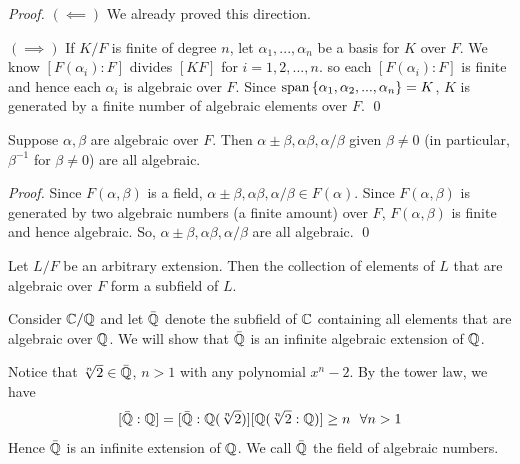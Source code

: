 \begin{proof}
    $(\impliedby)$ We already proved this direction.

    $(\implies)$ If $K/F$ is finite of degree $n$, let $\alpha_1, ..., \alpha_n$ be a basis for $K$ over $F$. We know $[F(\alpha_i):F]$ divides $[KF]$ for $i = 1,2,...,n$. so each $[F(\alpha_i):F]$ is finite and hence each $\alpha_i$ is algebraic over $F$. Since $\text{span} \left\{\alpha_1, \alpha_2,..., \alpha_n\right\} = K$, $K$ is generated by a finite number of algebraic elements over $F$.
    \qed
\end{proof}

\begin{corollary}
    Suppose $\alpha, \beta$ are algebraic over $F$. Then $\alpha \pm \beta, \alpha \beta, \alpha/\beta$ given $\beta \neq 0$ (in particular, $\beta^{-1}$ for $\beta \neq 0$) are all algebraic.
\end{corollary}

\begin{proof}
    Since $F(\alpha, \beta)$ is a field, $\alpha \pm \beta, \alpha \beta, \alpha/\beta \in F(\alpha)$. Since $F(\alpha, \beta)$ is generated by two algebraic numbers (a finite amount) over $F$, $F(\alpha, \beta)$ is finite and hence algebraic. So, $\alpha \pm \beta, \alpha \beta, \alpha/\beta$ are all algebraic.
    \qed
\end{proof}

\begin{corollary}
    Let $L/F$ be an arbitrary extension. Then the collection of elements of $L$ that are algebraic over $F$ form a subfield of $L$.
\end{corollary}

\begin{example}
    Consider $\mathbb{C}/\mathbb{Q}$ and let $\bar{\mathbb{Q}}$ denote the subfield of $\mathbb{C}$ containing all elements that are algebraic over $\mathbb{Q}$. We will show that $\bar{\mathbb{Q}}$ is an infinite algebraic extension of $\mathbb{Q}$.

    Notice that $\sqrt[n]{2} \in \bar{\mathbb{Q}}$, $n > 1$ with any polynomial $x^n - 2$. By the tower law, we have 
    $$[\bar{\mathbb{Q}} : \mathbb{Q}] = [\bar{\mathbb{Q}} : \mathbb{Q}(\sqrt[n]{2})][\mathbb{Q}(\sqrt[n]{2} : \mathbb{Q})] \geq n ~~\forall n > 1$$
    Hence $\bar{\mathbb{Q}}$ is an infinite extension of $\mathbb{Q}$. We call $\bar{\mathbb{Q}}$ the field of algebraic numbers.
\end{example}